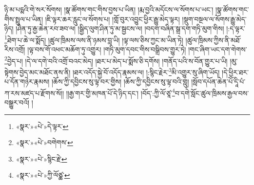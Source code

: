 ཉི་མ་པདྨའི་གེ་སར་སོགས། །སྣ་ཚོགས་གང་གིས་བྱས་པ་ཡིན། །རྨ་བྱའི་མདོངས་ལ་སོགས་པ་ཡང་། །སྣ་ཚོགས་གང་གིས་སྤྲུལ་པ་ཡིན། །ཇི་ལྟར་ཆར་རླུང་ལ་སོགས་པ། །གློ་བུར་འབྱུང་ཕྱིར་རྒྱུ་མེད་ལྟར། །སྡུག་བསྔལ་ལ་སོགས་རྒྱུ་མེད་ཉིད། །ཤིན་ཏུ་རྒྱ་ཆེན་རབ་ཟབ་ལ། །སྒྱིད་ལུག་ཤིན་ཏུ་མ་སྦྱངས་ལ། །བདག་བཞིན་སྒྲ་དག་གཏི་མུག་གིས། །:ད་ལྟར་\footnote{«སྣར་»«པེ་»དེ་ལྟར་}ཐེག་པ་ཆེ་ལ་སྨོད། །ཚུལ་ཁྲིམས་ལས་ནི་ཉམས་བླ་ཡི། །ལྟ་ལས་ཅིས་ཀྱང་མ་ཡིན་ཏེ། །ཚུལ་ཁྲིམས་ཀྱིས་ནི་མཐོ་རིས་འགྲོ། །ལྟ་བས་གོ་འཕང་མཆོག་ཏུ་འགྱུར། །གཏི་མུག་དབང་གིས་བསྒྲིབས་གྱུར་ཏེ། །གང་ཞིག་ཡང་དག་གེགས་\footnote{«སྣར་»«པེ་»བགེགས་}བྱེད་པ། །དེ་ལ་དགེ་བའི་འགྲོ་བའང་མེད། །ཐར་པ་མེད་པ་སྨོས་ཅི་དགོས། །གནོད་པའི་ས་བོན་གྱུར་པ་ཡི། །མུ་སྟེགས་བྱེད་མང་མཐོང་ནས་ནི། །ཐར་འདོད་སྐྱེ་བོ་འདོད་རྣམས་ལ། །:སྙིང་རྗེར་\footnote{«སྣར་»«པེ་»སྙིང་རྗེ་}མི་འགྱུར་སུ་ཞིག་ཡོད། །དེ་ཕྱིར་ཐར་པ་དོན་གཉེར་རྣམས། །ཆོས་ཀྱི་དབྱིངས་སུ་ལྟ་བར་གྱིས། །ཆོས་ཀྱི་དབྱིངས་སུ་ལྟ་བའི་གླུ། །སློབ་དཔོན་ཆེན་པོ་དཱི་པཾ་ཀ་རས་མཛད་པ་རྫོགས་སོ།། །།རྒྱ་གར་གྱི་མཁན་པོ་དེ་ཉིད་དང་། །བོད་:ཀྱི་ལོ་ཙཱ་\footnote{«སྣར་»«པེ་»ཀྱི་ལོཙྪ་}བ་དགེ་སློང་ཚུལ་ཁྲིམས་རྒྱལ་བས་བསྒྱུར་བའོ། ། 